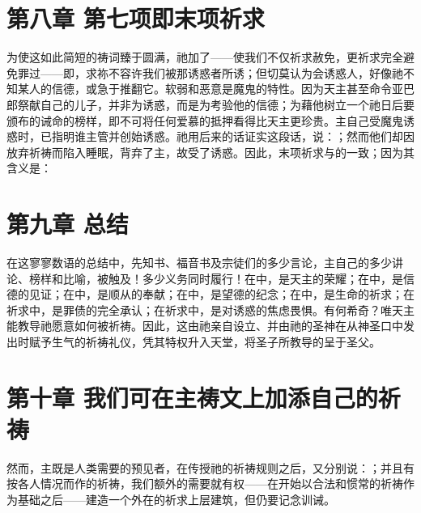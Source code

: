 
\section{第八章 第七项即末项祈求}

为使这如此简短的祷词臻于圆满，祂加了——使我们不仅祈求赦免，更祈求完全避免罪过——即，求祢不容许我们被那诱惑者所诱；但切莫认为会诱惑人，好像祂不知某人的信德，或急于推翻它。软弱和恶意是魔鬼的特性。因为天主甚至命令亚巴郎祭献自己的儿子，并非为诱惑，而是为考验他的信德；为藉他树立一个祂日后要颁布的诫命的榜样，即不可将任何爱慕的抵押看得比天主更珍贵。主自己受魔鬼诱惑时，已指明谁主管并创始诱惑。祂用后来的话证实这段话，说：；然而他们却因放弃祈祷而陷入睡眠，背弃了主，故受了诱惑。因此，末项祈求与的一致；因为其含义是：\par


\section{第九章 总结}

在这寥寥数语的总结中，先知书、福音书及宗徒们的多少言论，主自己的多少讲论、榜样和比喻，被触及！多少义务同时履行！在中，是天主的荣耀；在中，是信德的见证；在中，是顺从的奉献；在中，是望德的纪念；在中，是生命的祈求；在祈求中，是罪债的完全承认；在祈求中，是对诱惑的焦虑畏惧。有何希奇？唯天主能教导祂愿意如何被祈祷。因此，这由祂亲自设立、并由祂的圣神在从神圣口中发出时赋予生气的祈祷礼仪，凭其特权升入天堂，将圣子所教导的呈于圣父。\par


\section{第十章 我们可在主祷文上加添自己的祈祷}

然而，主既是人类需要的预见者，在传授祂的祈祷规则之后，又分别说：；并且有按各人情况而作的祈祷，我们额外的需要就有权——在开始以合法和惯常的祈祷作为基础之后——建造一个外在的祈求上层建筑，但仍要记念训诫。\par

